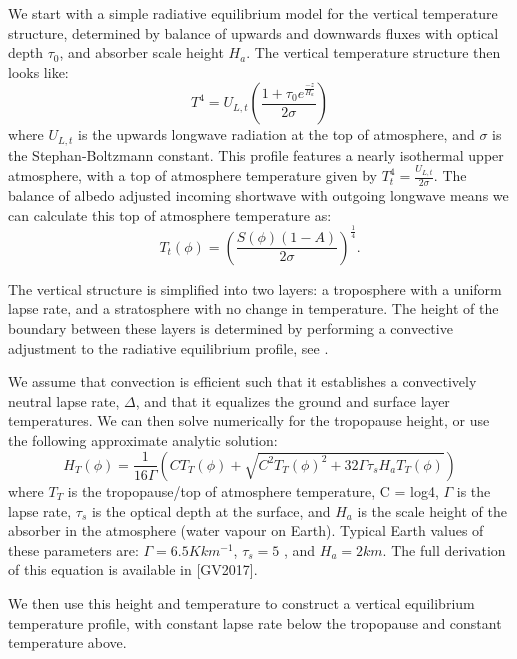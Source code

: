 \documentclass{ametsoc}
\begin{document}
We start with a simple radiative equilibrium model for the vertical temperature structure, determined by balance of upwards and downwards fluxes with optical depth $\tau_0$, and absorber scale height $H_a$. The vertical temperature structure then looks like:
\begin{equation}
\label{eq:vert_temp}
T^4 = U_{L,t} \left(\frac{1+\tau_0 e^{\frac{-z}{H_a}}}{2\sigma}\right)
\end{equation}
where $U_{L,t}$ is the upwards longwave radiation at the top of atmosphere, and $\sigma$ is the Stephan-Boltzmann constant. This profile features a nearly isothermal upper atmosphere, with a top of atmosphere temperature given by $T_t^4 = \frac{U_{L,t}}{2\sigma}$. The balance of albedo adjusted incoming shortwave with outgoing longwave means we can calculate this top of atmosphere temperature as:
\begin{equation}
\label{eq:toa_temp}
T_t(\phi) = \left(\frac{S(\phi)(1-A)}{2\sigma}\right)^{\frac{1}{4}}.
\end{equation}

The vertical structure is simplified into two layers: a troposphere with a uniform lapse rate, and a stratosphere with no change in temperature. The height of the boundary between these layers is determined by performing a convective adjustment to the radiative equilibrium profile, see \cite{Vallis2017}.

We assume that convection is efficient such that it establishes a convectively neutral lapse rate, $\Delta$, and that it equalizes the ground and surface layer temperatures. We can then solve numerically for the tropopause height, or use the following approximate analytic solution:
\begin{equation}
\label{eq:trop_height}
H_T(\phi) = \frac{1}{16\Gamma} \left(C T_T(\phi) + \sqrt{C^2 T_T(\phi)^2 + 32 \Gamma \tau_s H_a T_T(\phi)}\right)
\end{equation}
where $T_T$ is the tropopause/top of atmosphere temperature, C = log4, $\Gamma$ is the lapse rate, $\tau_s$ is the optical depth at the surface, and $H_a$ is the scale height of the absorber in the atmosphere (water vapour on Earth). Typical Earth values of these parameters are: $\Gamma = 6.5K km^{-1}$, $\tau_s = 5$ , and $H_a = 2 km$. The full derivation of this equation is available in \cite{GV2017} [GV2017].

We then use this height and temperature to construct a vertical equilibrium temperature profile, with constant lapse rate below the tropopause and constant temperature above.
\end{document}

